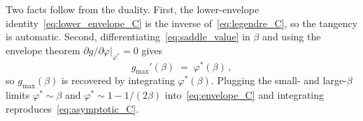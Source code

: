 \documentclass[letterpaper]{article} %
\newcommand{\Bnet}{\beta}
\newcommand{\p}{\partial}
\begin{document}
Two facts follow from the duality.  First, the lower-envelope
identity~\eqref{eq:lower_envelope_C} is the inverse
of~\eqref{eq:legendre_C}, so the tangency is automatic.  Second,
differentiating~\eqref{eq:saddle_value} in $\Bnet$ and using the
envelope theorem $\p g/\p\varphi|_{\varphi^*} = 0$ gives
\begin{equation}
g_{\max}'(\Bnet) \;=\; \varphi^*(\Bnet)\,,
\label{eq:envelope_C}
\end{equation}
so $g_{\max}(\Bnet)$ is recovered by integrating $\varphi^*(\Bnet)$.
Plugging the small- and large-$\Bnet$ limits $\varphi^* \sim \Bnet$
and $\varphi^* \sim 1 - 1/(2\Bnet)$ into~\eqref{eq:envelope_C} and
integrating reproduces~\eqref{eq:asymptotic_C}.
\end{document}
